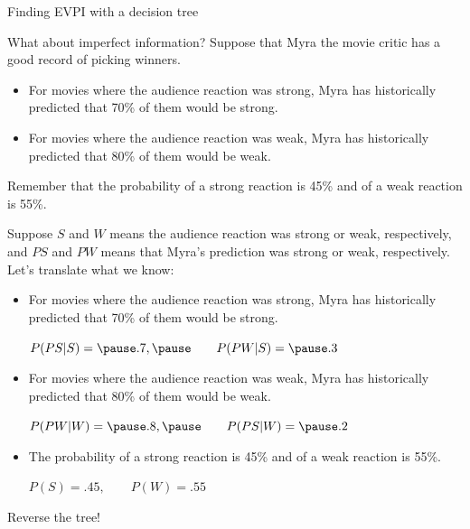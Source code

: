 \documentclass{beamer}\usepackage[]{graphicx}\usepackage[]{color}
\begin{document}
\begin{darkframes}
\begin{frame}[fragile]{Finding EVPI with a decision tree}
    \lc %
    \end{frame}  


    \begin{frame}[fragile]{What about imperfect information?}
      Suppose that Myra the movie critic has a good record of picking winners.
      \begin{itemize}
        \item For movies where the audience reaction was strong, Myra has historically predicted that 70\% of them would be strong.
        \item For movies where the audience reaction was weak, Myra has historically predicted that 80\% of them would be weak.
      \end{itemize}

      Remember that the probability of a strong reaction is 45\% and of a weak reaction is 55\%.

      \lc %
    \end{frame}

    \begin{frame}
      Suppose $S$ and $W$ means the audience reaction was strong or weak, respectively, and $PS$ and $PW$ means that Myra's prediction was strong or weak, respectively. Let's translate what we know:
      \pause
      \begin{itemize}
        \item For movies where the audience reaction was strong, Myra has historically predicted that 70\% of them would be strong.\pause

        $  P(PS|S) = \pause .7,\pause \qquad P(PW|S) = \pause .3 $ \pause
        \item For movies where the audience reaction was weak, Myra has historically predicted that 80\% of them would be weak.\pause

        $P(PW|W) = \pause .8,\pause \qquad P(PS|W) = \pause .2$  \pause
        \item The probability of a strong reaction is 45\% and of a weak reaction is 55\%.\pause
        
        $  P(S) = .45, \qquad P(W) = .55 $
      \end{itemize}
    \end{frame}



    \begin{frame}[fragile]{Reverse the tree!}


\end{frame}
\end{darkframes}
\end{document}
